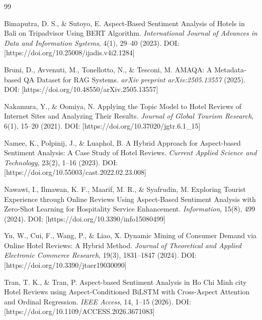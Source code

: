 \documentclass[pdflatex,sn-mathphys-num]{sn-jnl}
\theoremstyle{thmstyleone}
\theoremstyle{thmstyletwo}
\theoremstyle{thmstylethree}
\begin{document}


\begin{thebibliography}{99}
    
    Bimaputra, D. S., \& Sutoyo, E.
    Aspect-Based Sentiment Analysis of Hotels in Bali on Tripadvisor Using BERT Algorithm.
    \textit{International Journal of Advances in Data and Information Systems}, 4(1), 29--40 (2023).
    DOI: [https://doi.org/10.25008/ijadis.v4i2.1284]
    
    Bruni, D., Avvenuti, M., Tonellotto, N., \& Tesconi, M.
    AMAQA: A Metadata-based QA Dataset for RAG Systems.
    \textit{arXiv preprint arXiv:2505.13557} (2025).
    DOI: [https://doi.org/10.48550/arXiv.2505.13557]
    
    Nakamura, Y., \& Oomiya, N.
    Applying the Topic Model to Hotel Reviews of Internet Sites and Analyzing Their Results.
    \textit{Journal of Global Tourism Research}, 6(1), 15--20 (2021).
    DOI: [https://doi.org/10.37020/jgtr.6.1\_15]
    
    Namee, K., Polpinij, J., \& Luaphol, B.
    A Hybrid Approach for Aspect-based Sentiment Analysis: A Case Study of Hotel Reviews.
    \textit{Current Applied Science and Technology}, 23(2), 1--16 (2023).
    DOI: [https://doi.org/10.55003/cast.2022.02.23.008]
    
    Nawawi, I., Ilmawan, K. F., Maarif, M. R., \& Syafrudin, M.
    Exploring Tourist Experience through Online Reviews Using Aspect-Based Sentiment Analysis with Zero-Shot Learning for Hospitality Service Enhancement.
    \textit{Information}, 15(8), 499 (2024).
    DOI: [https://doi.org/10.3390/info15080499]
    
    Yu, W., Cui, F., Wang, P., \& Liao, X.
    Dynamic Mining of Consumer Demand via Online Hotel Reviews: A Hybrid Method.
    \textit{Journal of Theoretical and Applied Electronic Commerce Research}, 19(3), 1831--1847 (2024).
    DOI: [https://doi.org/10.3390/jtaer19030090]
    
    Tran, T. K., \& Tran, P.
    Aspect-based Sentiment Analysis in Ho Chi Minh city Hotel Reviews using Aspect-Conditioned BiLSTM with Cross-Aspect Attention and Ordinal Regression.
    \textit{IEEE Access}, 14, 1--15 (2026).
    DOI: [https://doi.org/10.1109/ACCESS.2026.3671083]
    
\end{thebibliography}
\end{document}
